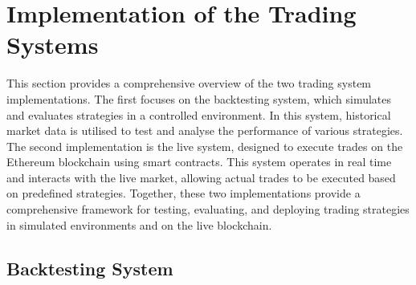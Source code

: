 \chapter{Implementation of the Trading Systems}
This section provides a comprehensive overview of the two trading system implementations. The first focuses on the backtesting system, which simulates and evaluates strategies in a controlled environment. In this system, historical market data is utilised to test and analyse the performance of various strategies. The second implementation is the live system, designed to execute trades on the Ethereum blockchain using smart contracts. This system operates in real time and interacts with the live market, allowing actual trades to be executed based on predefined strategies. Together, these two implementations provide a comprehensive framework for testing, evaluating, and deploying trading strategies in simulated environments and on the live blockchain.

\section{Backtesting System}
\label{sec:backtesting-sys}

